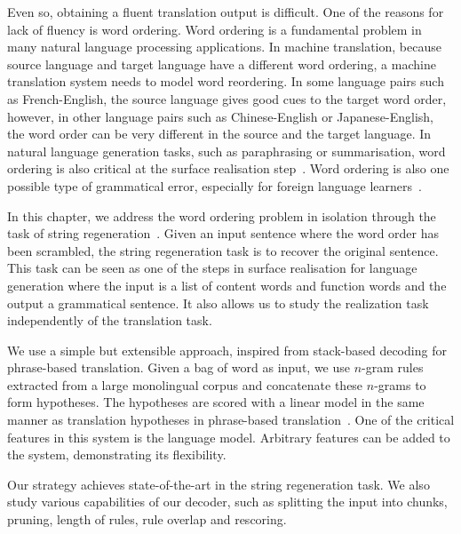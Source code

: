Even so, obtaining a fluent translation output is difficult.
One of the reasons for lack of fluency is word ordering.
Word ordering is a fundamental problem in many natural language
processing applications.
In machine translation, because
source language and target language have a different word
ordering, a machine translation system needs to model word
reordering. In some language pairs such as French-English, the
source language gives good cues to the target word order, however,
in other language pairs such as Chinese-English or Japanese-English,
the word order can be very different in the source and
the target language. In natural language generation tasks, such
as paraphrasing or summarisation, word ordering
is also critical at the surface realisation
step~\citep{reiter-dale:1997:JNLE}.
Word ordering is also one possible type of grammatical
error, especially for foreign language
learners~\citep{yu-chen:2012:COLING}.

In this chapter, we address the word ordering problem in
isolation through the task of
string regeneration~\citep{wan-dras-dale-paris:2009:EACL}.
Given an input sentence where the word order has
been scrambled, the string regeneration task is to recover
the original sentence. This task can be seen as one of the
steps in surface realisation for language generation where
the input is a list of content words and function words and
the output a grammatical sentence. It also allows us to study
the realization task independently of the translation task.

We use a simple but extensible approach, inspired from
stack-based decoding for phrase-based translation.
Given a bag of word as input, we use $n$-gram rules
extracted from a large monolingual corpus and concatenate
these $n$-grams to form hypotheses. The hypotheses are scored
with a linear model in the same manner as translation
hypotheses in phrase-based translation~\citep{och-ney:2002:ACL}.
One of the critical features in this system
is the language model. Arbitrary features can be added to the
system, demonstrating its flexibility.

Our strategy achieves state-of-the-art in the string regeneration
task. We also study various capabilities of our decoder, such as
splitting the input into chunks, pruning, length of rules, rule overlap
and rescoring. %

